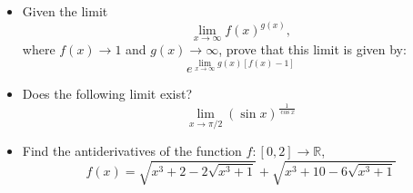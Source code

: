 \documentclass[12pt]{article}
\begin{document}
\begin{itemize}
    \item[\quad \textbf{a.}] Given the limit  
    \[\displaystyle \lim_{x \to \infty} f(x)^{g(x)},\]  
    where \( f(x) \to 1 \) and \( g(x) \to \infty \), prove that this limit is given by:  
    \[\displaystyle e^{\lim_{x \to \infty} g(x) [f(x) - 1]}\]
    
    \vspace{20mm}
    \item[\quad \textbf{b.}] Does the following limit exist? \[\displaystyle \lim_{x \to \pi/2}(\sin x)^\frac{1}{\cos x}\]
    
    \vspace{20mm}
    \item[\quad \textbf{c.}] Find the antiderivatives of the function $f:[0,2]\to \mathbb{R}$,
    \[
    f(x) = \sqrt{x^3+2-2\sqrt{x^3+1}}+\sqrt{x^3+10-6\sqrt{x^3+1}}
    \]
\end{itemize}

\vspace{5mm}

\end{document}
